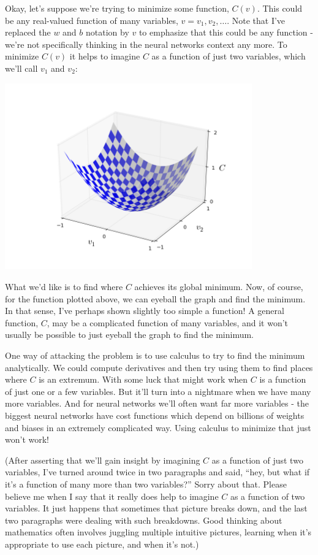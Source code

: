 Okay, let's suppose we're trying to minimize some function, $C(v)$. This could be any real-valued function of many variables, $v=v_1,v_2,\ldots$. Note that I've replaced the $w$ and $b$ notation by $v$ to emphasize that this could be any function - we're not specifically thinking in the neural networks context any more. To minimize $C(v)$ it helps to imagine $C$ as a function of just two variables, which we'll call $v_1$ and $v_2$:

{\centering
\includegraphics[width=0.8\textwidth,]{pic/valley}
\par}

What we'd like is to find where $C$ achieves its global minimum. Now, of course, for the function plotted above, we can eyeball the graph and find the minimum. In that sense, I've perhaps shown slightly too simple a function! A general function, $C$, may be a complicated function of many variables, and it won't usually be possible to just eyeball the graph to find the minimum.

One way of attacking the problem is to use calculus to try to find the minimum analytically. We could compute derivatives and then try using them to find places where $C$ is an extremum. With some luck that might work when $C$ is a function of just one or a few variables. But it'll turn into a nightmare when we have many more variables. And for neural networks we'll often want far more variables - the biggest neural networks have cost functions which depend on billions of weights and biases in an extremely complicated way. Using calculus to minimize that just won't work!

(After asserting that we'll gain insight by imagining $C$ as a function of just two variables, I've turned around twice in two paragraphs and said, ``hey, but what if it's a function of many more than two variables?'' Sorry about that. Please believe me when I say that it really does help to imagine $C$ as a function of two variables. It just happens that sometimes that picture breaks down, and the last two paragraphs were dealing with such breakdowns. Good thinking about mathematics often involves juggling multiple intuitive pictures, learning when it's appropriate to use each picture, and when it's not.)

